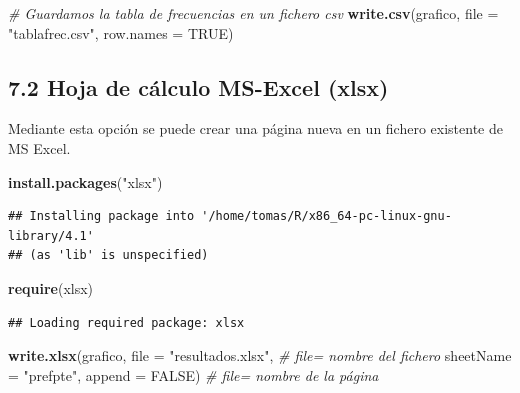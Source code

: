 \documentclass[
]{article}
\newenvironment{Shaded}{\begin{snugshade}}{\end{snugshade}}
\newcommand{\AttributeTok}[1]{\textcolor[rgb]{0.13,0.29,0.53}{#1}}
\newcommand{\CommentTok}[1]{\textcolor[rgb]{0.56,0.35,0.01}{\textit{#1}}}
\newcommand{\ConstantTok}[1]{\textcolor[rgb]{0.56,0.35,0.01}{#1}}
\newcommand{\FunctionTok}[1]{\textcolor[rgb]{0.13,0.29,0.53}{\textbf{#1}}}
\newcommand{\NormalTok}[1]{#1}
\newcommand{\StringTok}[1]{\textcolor[rgb]{0.31,0.60,0.02}{#1}}
\begin{document}
\begin{Shaded}
\begin{Highlighting}[]
\CommentTok{\# Guardamos la tabla de frecuencias en un fichero csv}
\FunctionTok{write.csv}\NormalTok{(grafico, }\AttributeTok{file =} \StringTok{"tablafrec.csv"}\NormalTok{, }\AttributeTok{row.names =} \ConstantTok{TRUE}\NormalTok{) }
\end{Highlighting}
\end{Shaded}

\hypertarget{hoja-de-cuxe1lculo-ms-excel-xlsx}{%
\subsection{7.2 Hoja de cálculo MS-Excel
(xlsx)}\label{hoja-de-cuxe1lculo-ms-excel-xlsx}}

Mediante esta opción se puede crear una página nueva en un fichero
existente de MS Excel.

\begin{Shaded}
\begin{Highlighting}[]
\FunctionTok{install.packages}\NormalTok{(}\StringTok{"xlsx"}\NormalTok{)}
\end{Highlighting}
\end{Shaded}

\begin{verbatim}
## Installing package into '/home/tomas/R/x86_64-pc-linux-gnu-library/4.1'
## (as 'lib' is unspecified)
\end{verbatim}

\begin{Shaded}
\begin{Highlighting}[]
\FunctionTok{require}\NormalTok{(xlsx)}
\end{Highlighting}
\end{Shaded}

\begin{verbatim}
## Loading required package: xlsx
\end{verbatim}

\begin{Shaded}
\begin{Highlighting}[]
\FunctionTok{write.xlsx}\NormalTok{(grafico, }\AttributeTok{file =} \StringTok{"resultados.xlsx"}\NormalTok{,               }\CommentTok{\# file= nombre del fichero}
           \AttributeTok{sheetName =} \StringTok{"prefpte"}\NormalTok{, }\AttributeTok{append =} \ConstantTok{FALSE}\NormalTok{)           }\CommentTok{\# file= nombre de la página}
\end{Highlighting}
\end{Shaded}
\end{document}
